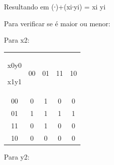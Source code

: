 \documentclass{article}
\begin{document}
Resultando em (∙)+(xi∙yi) = xi \oplus yi

Para verificar se é maior ou menor:

Para x2:
\begin{table}[h]
 \centering
 {\renewcommand\arraystretch{1.25}
 \begin{tabular}{ l l l l l }
  \cline{1-1}\cline{2-2}\cline{3-3}\cline{4-4}\cline{5-5}  
    \multicolumn{1}{|c|}{x0y0  			

x1y1} &
    \multicolumn{1}{c|}{00} &
    \multicolumn{1}{c|}{01} &
    \multicolumn{1}{c|}{11} &
    \multicolumn{1}{c|}{10}
  \\  
  \cline{1-1}\cline{2-2}\cline{3-3}\cline{4-4}\cline{5-5}  
    \multicolumn{1}{|c|}{00} &
    \multicolumn{1}{c|}{0} &
    \multicolumn{1}{c|}{1} &
    \multicolumn{1}{c|}{0} &
    \multicolumn{1}{c|}{0}
  \\  
  \cline{1-1}\cline{2-2}\cline{3-3}\cline{4-4}\cline{5-5}  
    \multicolumn{1}{|c|}{01} &
    \multicolumn{1}{c|}{1} &
    \multicolumn{1}{c|}{1} &
    \multicolumn{1}{c|}{1} &
    \multicolumn{1}{c|}{1}
  \\  
  \cline{1-1}\cline{2-2}\cline{3-3}\cline{4-4}\cline{5-5}  
    \multicolumn{1}{|c|}{11} &
    \multicolumn{1}{c|}{0} &
    \multicolumn{1}{c|}{1} &
    \multicolumn{1}{c|}{0} &
    \multicolumn{1}{c|}{0}
  \\  
  \cline{1-1}\cline{2-2}\cline{3-3}\cline{4-4}\cline{5-5}  
    \multicolumn{1}{|c|}{10} &
    \multicolumn{1}{c|}{0} &
    \multicolumn{1}{c|}{0} &
    \multicolumn{1}{c|}{0} &
    \multicolumn{1}{c|}{0}
  \\  
  \hline

 \end{tabular} }
\end{table}

Para y2:
\end{document}
